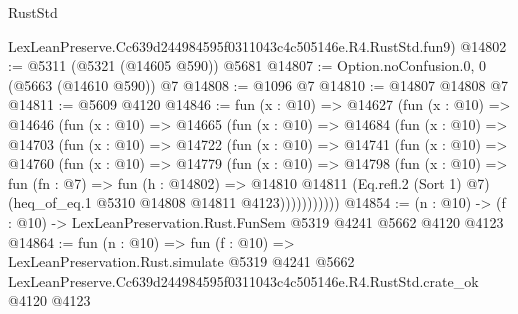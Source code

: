 \begin{lexlean}{RustStd}
\begin{coremodule}
    LexLeanPreserve.Cc639d244984595f0311043c4c505146e.R4.RustStd.fun9)
@14802 := @5311 (@5321 (@14605 @590)) @5681
@14807 := Option.noConfusion.{0, 0} (@5663 (@14610 @590)) @7
@14808 := @1096 @7
@14810 := @14807 @14808 @7
@14811 := @5609 @4120
@14846 := fun (x : @10) =>
  @14627
    (fun (x : @10) =>
    @14646
      (fun (x : @10) =>
      @14665
        (fun (x : @10) =>
        @14684
          (fun (x : @10) =>
          @14703
            (fun (x : @10) =>
            @14722
              (fun (x : @10) =>
              @14741
                (fun (x : @10) =>
                @14760
                  (fun (x : @10) =>
                  @14779
                    (fun (x : @10) =>
                    @14798
                      (fun (x : @10) =>
                      fun (fn : @7) =>
                      fun (h : @14802) =>
                      @14810
                        @14811
                        (Eq.refl.{2} (Sort 1) @7)
                        (heq_of_eq.{1} @5310 @14808 @14811 @4123)))))))))))
@14854 := (n : @10) -> (f : @10) -> LexLeanPreservation.Rust.FunSem @5319 @4241 @5662 @4120 @4123
@14864 := fun (n : @10) =>
  fun (f : @10) =>
  LexLeanPreservation.Rust.simulate
    @5319
    @4241
    @5662
    LexLeanPreserve.Cc639d244984595f0311043c4c505146e.R4.RustStd.crate_ok
    @4120
    @4123
\end{coremodule}
\end{lexlean}
